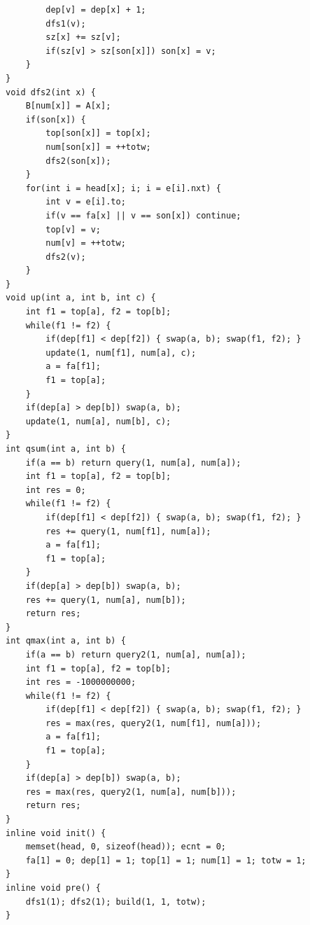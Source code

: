 \documentclass[10pt]{ctexart}
\begin{document}
{\begin{lstlisting}
        dep[v] = dep[x] + 1;
        dfs1(v);
        sz[x] += sz[v];
        if(sz[v] > sz[son[x]]) son[x] = v;
    }
}
void dfs2(int x) {
    B[num[x]] = A[x];
    if(son[x]) {
        top[son[x]] = top[x];
        num[son[x]] = ++totw;
        dfs2(son[x]);
    }
    for(int i = head[x]; i; i = e[i].nxt) {
        int v = e[i].to;
        if(v == fa[x] || v == son[x]) continue;
        top[v] = v;
        num[v] = ++totw;
        dfs2(v);
    }
}
void up(int a, int b, int c) {
    int f1 = top[a], f2 = top[b];
    while(f1 != f2) {
        if(dep[f1] < dep[f2]) { swap(a, b); swap(f1, f2); }
        update(1, num[f1], num[a], c);
        a = fa[f1];
        f1 = top[a];
    }
    if(dep[a] > dep[b]) swap(a, b);
    update(1, num[a], num[b], c);
}
int qsum(int a, int b) {
    if(a == b) return query(1, num[a], num[a]);
    int f1 = top[a], f2 = top[b];
    int res = 0;
    while(f1 != f2) {
        if(dep[f1] < dep[f2]) { swap(a, b); swap(f1, f2); }
        res += query(1, num[f1], num[a]);
        a = fa[f1];
        f1 = top[a];
    }
    if(dep[a] > dep[b]) swap(a, b);
    res += query(1, num[a], num[b]);
    return res;
}
int qmax(int a, int b) {
    if(a == b) return query2(1, num[a], num[a]);
    int f1 = top[a], f2 = top[b];
    int res = -1000000000;
    while(f1 != f2) {
        if(dep[f1] < dep[f2]) { swap(a, b); swap(f1, f2); }
        res = max(res, query2(1, num[f1], num[a]));
        a = fa[f1];
        f1 = top[a];
    }
    if(dep[a] > dep[b]) swap(a, b);
    res = max(res, query2(1, num[a], num[b]));
    return res;
}
inline void init() {
    memset(head, 0, sizeof(head)); ecnt = 0;
    fa[1] = 0; dep[1] = 1; top[1] = 1; num[1] = 1; totw = 1;
}
inline void pre() {
    dfs1(1); dfs2(1); build(1, 1, totw);
}
\end{lstlisting}
}
\end{document}
